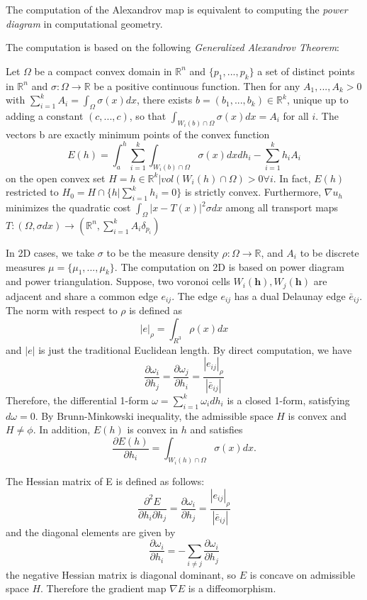 \documentclass[runningheads]{llncs}
\begin{document}
The computation of the Alexandrov map is equivalent to computing the \textit{power diagram} in computational geometry.


The computation is based on the following \textit{Generalized Alexandrov Theorem}:

\begin{theorem}
Let $\Omega$ be a compact convex domain in $\mathbb{R}^n$ and $\{p_1,...,p_k\}$ a set of distinct points in $\mathbb{R}^n$ and $\sigma:\Omega \rightarrow \mathbb{R}$ be a positive continuous function. Then for any $A_1,...,A_k>0$ with $\sum^k_{i=1}A_i=\int_\Omega \sigma(x)dx$, there exists $b=(b_1,...,b_k)\in \mathbb{R}^k$, unique up to adding a constant $(c,...,c)$, so that $\int_{W_i(b)\cap\Omega}\sigma(x)dx=A_i$ for all $i$. The vectors b are exactly minimum points of the convex function $$E(h) = \int ^h_a \sum^k_{i=1}\int_{W_i(b)\cap \Omega}\sigma(x)dxdh_i-\sum^k_{i=1}h_iA_i$$
on the open convex set $H={h\in\mathbb{R}^k|vol({W_i(h)\cap \Omega})>0 \forall i}$. In fact, $E(h)$ restricted to $H_0=H\cap\{h|\sum^k_{i=1}h_i=0\}$ is strictly convex. Furthermore, $\nabla u_h$ minimizes the quadratic cost $\int_{\Omega}|x-T(x)|^2\sigma dx$ among all transport maps $T:(\Omega, \sigma dx)\rightarrow(\mathbb{R}^n,\sum^k_{i=1}A_i\delta_{p_i})$
\end{theorem}

In 2D cases, we take $\sigma$ to be the measure density $\rho:\Omega\rightarrow\mathbb{R}$, and $A_i$ to be discrete measures $\mu=\{\mu_1,...,\mu_k\}$. The computation on 2D is based on power diagram and power triangulation. Suppose, two voronoi cells $W_i(\mathbf{h}),W_j(\mathbf{h}) $ are adjacent and share a common edge $e_{ij}$. The edge $e_{ij}$ has a dual Delaunay edge $\bar{e}_{ij}$. The norm with respect to $\rho$ is defined as $$|e|_\rho=\int_{R^3}\rho(x)dx$$ and $|e|$ is just the traditional Euclidean length. By direct computation, we have $$\dfrac{\partial\omega_i}{\partial h_j}=\dfrac{\partial\omega_j}{\partial h_i}=\dfrac{|e_{ij}|_\rho}{|\bar{e}_{ij}|} $$
Therefore, the differential 1-form $\omega=\sum^k_{i=1}\omega_idh_i$ is a closed 1-form, satisfying $d\omega=0$. By Brunn-Minkowski inequality\cite{gardner2002brunn}, the admissible space $H$ is convex and $H \neq \phi$. In addition, $E(h)$ is convex in $h$ and satisfies $$\dfrac{\partial E(h)}{\partial h_i}=\int_{W_i(h)\cap \Omega}\sigma(x)dx.$$

The Hessian matrix of E is defined as follows: $$\dfrac{\partial ^2E}{\partial h_i\partial h_j}=\dfrac{\partial \omega_i}{\partial h_j}=\dfrac{|e_{ij}|_\rho}{|\bar{e}_{ij}|}$$ and the diagonal elements are given by $$\dfrac{\partial \omega_i}{\partial h_i}=-\sum_{i\neq j}\dfrac{\partial \omega_i}{\partial h_j}$$
the negative Hessian matrix is diagonal dominant, so $E$ is concave on admissible space $H$. Therefore the gradient map $\nabla E$ is a diffeomorphism.
\end{document}
